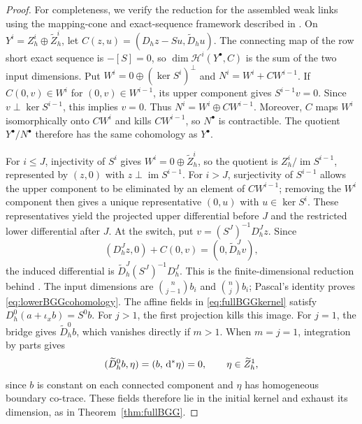 \documentclass[10pt]{amsart}
\numberwithin{equation}{section}
\newcommand{\dd}{\,{\rm d}}
\begin{document}
\begin{proof}
For completeness, we verify the reduction for the assembled weak links
using the mapping-cone and exact-sequence framework described in
\cite[Section~3.1 and Proposition~4.2]{Christiansen2026BGG}.
On $Y^i=Z_h^i\oplus\widetilde Z_h^i$, let
$C(z,u)=(D_hz-Su,\widetilde D_hu)$.
The connecting map of the row short exact sequence is $-[S]=0$,
so $\dim \mathscr H^i(Y^\bullet,C)$ is the sum of the two input dimensions.
Put $W^i=0\oplus(\ker S^i)^\perp$ and $N^i=W^i+CW^{i-1}$.
If $C(0,v)\in W^i$ for $(0,v)\in W^{i-1}$, its upper component gives
$S^{i-1}v=0$. Since $v\perp\ker S^{i-1}$, this implies $v=0$.
Thus $N^i=W^i\oplus CW^{i-1}$. Moreover, $C$ maps $W^i$ isomorphically
onto $CW^i$ and kills $CW^{i-1}$, so $N^\bullet$ is contractible.
The quotient $Y^\bullet/N^\bullet$ therefore has the same cohomology as
$Y^\bullet$.

For $i\leq J$, injectivity of $S^i$ gives
$W^i=0\oplus\widetilde Z_h^i$, so the quotient is
$Z_h^i/\operatorname{im}S^{i-1}$, represented by $(z,0)$ with
$z\perp\operatorname{im}S^{i-1}$.
For $i>J$, surjectivity of $S^{i-1}$ allows the upper component to be
eliminated by an element of $CW^{i-1}$; removing the $W^i$ component
then gives a unique representative $(0,u)$ with $u\in\ker S^i$.
These representatives yield the projected upper differential before
$J$ and the restricted lower differential after $J$.
At the switch, put $v=(S^J)^{-1}D_h^Jz$. Since
\[
(D_h^Jz,0)+C(0,v)=(0,\widetilde D_h^Jv),
\]
the induced differential is $\widetilde D_h^J(S^J)^{-1}D_h^J$. This is the finite-dimensional reduction behind
\cite[Theorem 6, (27)]{ArnoldHu2021}.
The input dimensions are $\binom n{j-1}b_i$ and $\binom nj b_i$;
Pascal's identity proves \eqref{eq:lowerBGGcohomology}.
The affine fields in \eqref{eq:fullBGGkernel} satisfy
$D_h^0(a+\iota_xb)=S^0b$.
For $j>1$, the first projection kills this image. For $j=1$, the bridge
gives $\widetilde D_h^0b$, which vanishes directly if $m>1$.
When $m=j=1$, integration by parts gives
\[
(\widetilde D_h^0b,\eta)=(b,\dd^*\eta)=0,
\qquad \eta\in\widetilde Z_h^1,
\]
since $b$ is constant on each connected component and $\eta$ has
homogeneous boundary co-trace. These fields therefore lie in the initial
kernel and exhaust its dimension, as in Theorem~\ref{thm:fullBGG}.


\end{proof}
\end{document}
